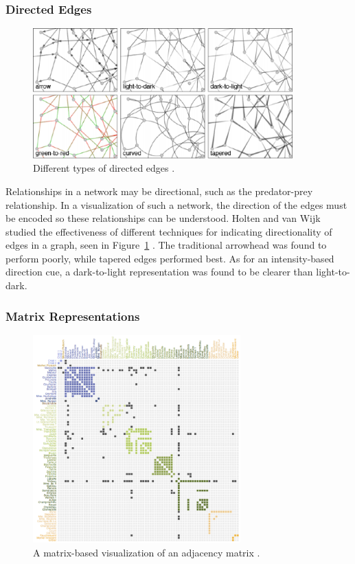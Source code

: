 \subsubsection{Directed Edges}

\begin{figure}[h]
	\centering
	\includegraphics[width=10cm]{figures/eps/directedEdges.eps}
	\caption{Different types of directed edges \cite{holten2009}.}
	\label{fig:directedEdges}
\end{figure}

Relationships in a network may be directional, such as the predator-prey relationship.  In a visualization of such a network, the direction of the edges must be encoded so these relationships can be understood.  Holten and van Wijk studied the effectiveness of different techniques for indicating directionality of edges in a graph, seen in Figure~\ref{fig:directedEdges} \cite{holten2009}.  The traditional arrowhead was found to perform poorly, while tapered edges performed best.  As for an intensity-based direction cue, a dark-to-light representation was found to be clearer than light-to-dark.

\subsubsection{Matrix Representations}

\begin{figure}[h]
	\centering
	\includegraphics[width=8cm]{figures/eps/matrix.eps}
	\caption{A matrix-based visualization of an adjacency matrix \cite{knuth1993}.}
	\label{fig:matrix}
\end{figure}

